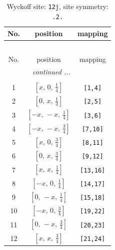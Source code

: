 \documentclass[fleqn,8pt]{jsarticle}
\begin{document}
\begin{longtable}{ccc}
\caption{Wyckoff site: {\tt 12j}, site symmetry: {\tt .2.}}
 \\
 \hline \hline
No. & position & mapping \\ \hline \endfirsthead

\multicolumn{2}{l}{\tablename\ \thetable{}} \\
 \hline \hline
No. & position & mapping \\ \hline \endhead

 \hline \hline
\multicolumn{2}{r}{\footnotesize\it continued ...} \\ \endfoot

 \hline \hline
\multicolumn{2}{r}{} \\ \endlastfoot

1 & $\left[ x,\, 0,\, \frac{1}{4} \right]$ & {\tt [1,4]} \\ \hline
2 & $\left[ 0,\, x,\, \frac{1}{4} \right]$ & {\tt [2,5]} \\ \hline
3 & $\left[ - x,\, - x,\, \frac{1}{4} \right]$ & {\tt [3,6]} \\ \hline
4 & $\left[ - x,\, - x,\, \frac{3}{4} \right]$ & {\tt [7,10]} \\ \hline
5 & $\left[ x,\, 0,\, \frac{3}{4} \right]$ & {\tt [8,11]} \\ \hline
6 & $\left[ 0,\, x,\, \frac{3}{4} \right]$ & {\tt [9,12]} \\ \hline
7 & $\left[ x,\, x,\, \frac{1}{4} \right]$ & {\tt [13,16]} \\ \hline
8 & $\left[ - x,\, 0,\, \frac{1}{4} \right]$ & {\tt [14,17]} \\ \hline
9 & $\left[ 0,\, - x,\, \frac{1}{4} \right]$ & {\tt [15,18]} \\ \hline
10 & $\left[ - x,\, 0,\, \frac{3}{4} \right]$ & {\tt [19,22]} \\ \hline
11 & $\left[ 0,\, - x,\, \frac{3}{4} \right]$ & {\tt [20,23]} \\ \hline
12 & $\left[ x,\, x,\, \frac{3}{4} \right]$ & {\tt [21,24]} \\
\end{longtable}
\renewcommand{\arraystretch}{1.2}
\end{document}
